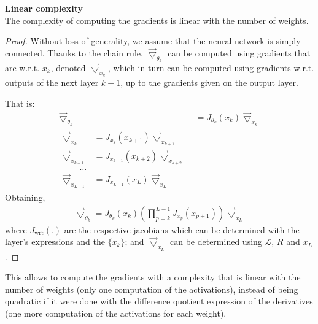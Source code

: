 \begin{remark}\textbf{Linear complexity}\\
{The complexity of computing the gradients is linear with the number of weights.}
\begin{proof}
Without loss of generality, we assume that the neural network is simply connected. Thanks to the chain rule, $\vec{\bigtriangledown}_{\theta_k}$ can be computed using gradients that are w.r.t. $x_k$, denoted $\vec{\bigtriangledown}_{x_k}$, which in turn can be computed using gradients w.r.t. outputs of the next layer $k+1$, up to the gradients given on the output layer.

That is:
\begin{align}
  \vec{\bigtriangledown}_{\theta_k} & = J_{\theta_k}(x_k) \vec{\bigtriangledown}_{x_k} \\
  \begin{split}
  \vec{\bigtriangledown}_{x_k} & = J_{x_k}(x_{k+1}) \vec{\bigtriangledown}_{x_{k+1}} \\
  \vec{\bigtriangledown}_{x_{k+1}} & = J_{x_{k+1}}(x_{k+2}) \vec{\bigtriangledown}_{x_{k+2}} \\
  \quad \quad \ldots\\
  \vec{\bigtriangledown}_{x_{L-1}} & = J_{x_{L-1}}(x_{L}) \vec{\bigtriangledown}_{x_{L}}
  \label{eq:bp}
  \end{split}
\end{align}
Obtaining,
\begin{align}
  \vec{\bigtriangledown}_{\theta_k} = J_{\theta_k}(x_k) (\prod_{p=k}^{L-1} J_{x_p}(x_{p+1})) \vec{\bigtriangledown}_{x_L}
\end{align}
where $J_{\text{wrt}}(.)$ are the respective jacobians which can be determined with the layer's expressions and the $\{x_k\}$; and $\vec{\bigtriangledown}_{x_L}$ can be determined using $\mathcal{L}$, $R$ and $x_L$.
\end{proof}
This allows to compute the gradients with a complexity that is linear with the number of weights (only one computation of the activations), instead of being quadratic if it were done with the difference quotient expression of the derivatives (one more computation of the activations for each weight).
\end{remark}

